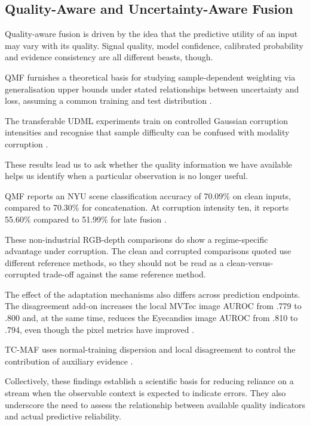 \subsection{Quality-Aware and Uncertainty-Aware Fusion}

Quality-aware fusion is driven by the idea that the predictive utility of an input may vary with its
quality. Signal quality, model confidence, calibrated probability and evidence consistency are all
different beasts, though.

QMF furnishes a theoretical basis for studying sample-dependent weighting via generalisation upper
bounds under stated relationships between uncertainty and loss, assuming a common training and test
distribution \citep[PDF pp.~4--5]{Zhang2023QMF}.

The transferable UDML experiments train on controlled Gaussian corruption intensities and recognise
that sample difficulty can be confused with modality corruption \citep[PDF pp.~4--5, 9]{P022}.

These results lead us to ask whether the quality information we have available helps us identify
when a particular observation is no longer useful.

QMF reports an NYU scene classification accuracy of 70.09\% on clean inputs, compared to 70.30\% for
concatenation. At corruption intensity ten, it reports 55.60\% compared to 51.99\% for late fusion
\citep[PDF p.~8, Table~1]{Zhang2023QMF}.

These non-industrial RGB-depth comparisons do show a regime-specific advantage under corruption. The
clean and corrupted comparisons quoted use different reference methods, so they should not be read
as a clean-versus-corrupted trade-off against the same reference method.

The effect of the adaptation mechanisms also differs across prediction endpoints. The disagreement
add-on increases the local MVTec image AUROC from .779 to .800 and, at the same time, reduces the
Eyecandies image AUROC from .810 to .794, even though the pixel metrics have improved \citep[PDF
pp.~10--11, Tables~4--5]{P033}.

TC-MAF uses normal-training dispersion and local disagreement to control the contribution of
auxiliary evidence \citep{P026}.

Collectively, these findings establish a scientific basis for reducing reliance on a stream when the
observable context is expected to indicate errors. They also underscore the need to assess the
relationship between available quality indicators and actual predictive reliability.

